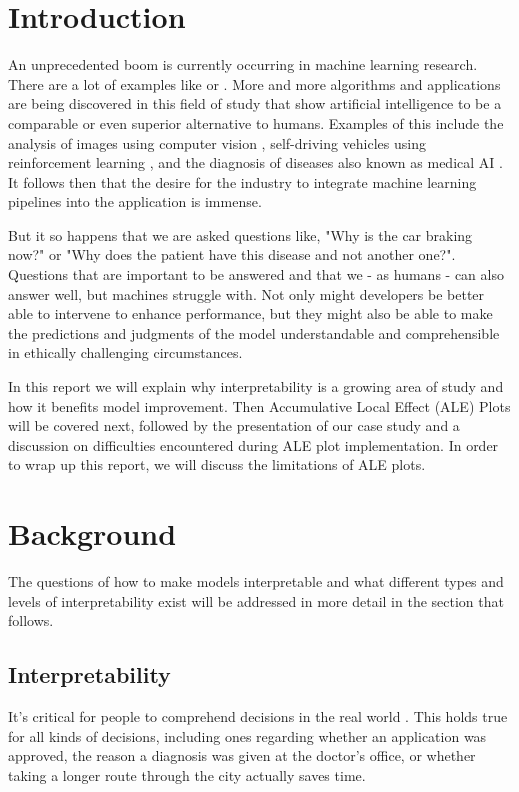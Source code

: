 \documentclass[11pt,
  a4paper,
  parskip=half, %
  BCOR=10mm, %
  english,
  ]{article}
\begin{document}
 


\tableofcontents
\newpage

\section{Introduction}
An unprecedented boom is currently occurring in machine learning research. There are a lot of examples like \cite{GIBERT2020102526} or \cite{AlphaFold2021} .
More and more algorithms and applications are being discovered in this field of study that show artificial intelligence to be a comparable or even superior alternative to humans.
Examples of this include the analysis of images using computer vision \cite{resNEt}, self-driving vehicles using reinforcement learning \cite{rlDriving}, and the diagnosis of diseases also known as medical AI \cite{aiHealthCare}.
It follows then that the desire for the industry to integrate machine learning pipelines into the application is immense. 

But it so happens that we are asked questions like, "Why is the car braking now?" or "Why does the patient have this disease and not another one?".
Questions that are important to be answered and that we - as humans - can also answer well, but machines struggle with.
Not only might developers be better able to intervene to enhance performance, but they might also be able to make the predictions and judgments of the model understandable and comprehensible in ethically challenging circumstances. 

In this report we will explain why interpretability is a growing area of study and how it benefits model improvement.
Then Accumulative Local Effect (ALE) Plots will be covered next, followed by the presentation of our case study
and a discussion on difficulties encountered during ALE plot implementation.
In order to wrap up this report, we will discuss the limitations of ALE plots. 


\section{Background}
The questions of how to make models interpretable and what different types and levels of interpretability exist will be addressed in more detail in the section that follows. 


\subsection{Interpretability}
It's critical for people to comprehend decisions in the real world \cite{molnar2022}.
This holds true for all kinds of decisions, including ones regarding whether an application was approved, the reason a diagnosis was given at the doctor's office, or whether taking a longer route through the city actually saves time.
\end{document}
